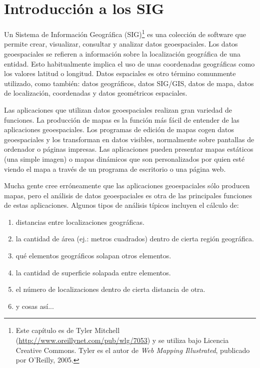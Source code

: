 
\section{Introducción a los SIG}\label{label_intro}


Un Sistema de Información Geográfica (SIG)\cite{mitchel05}\footnote{Este 
capítulo es de Tyler Mitchell (\url{http://www.oreillynet.com/pub/wlg/7053}) y 
se utiliza bajo Licencia Creative Commons. Tyler es el autor de 
\textit{Web Mapping Illustrated}, publicado por O'Reilly, 2005.}
es una colección de software que permite crear, visualizar, consultar y 
analizar datos geoespaciales. Los datos geoespaciales se refieren a 
información sobre la localización geográfica de una entidad. Esto 
habitualmente implica el uso de unas coordenadas geográficas como los valores 
latitud o longitud. Datos espaciales es otro término comunmente utilizado, como 
también: datos geográficos, datos SIG/GIS, datos de mapa, datos de localización, 
coordenadas y datos geométricos espaciales.

Las aplicaciones que utilizan datos geoespaciales realizan gran variedad de 
funciones. La producción de mapas es la función más fácil de entender de 
las aplicaciones geoespaciales. Los programas de edición de mapas cogen datos 
geoespaciales y los transforman en datos visibles, normalmente sobre pantallas
de ordenador o páginas impresas.
Las aplicaciones pueden presentar mapas estáticos (una simple imagen) o mapas
dinámicos que son personalizados por quien esté viendo el mapa a través de 
un programa de escritorio o una página web.

Mucha gente cree erróneamente que las aplicaciones geoespaciales sólo producen
mapas, pero el análisis de datos geoespaciales es otra de las principales 
funciones de estas aplicaciones. Algunos tipos de análisis típicos incluyen
el cálculo de:

\begin{enumerate}
\item distancias entre localizaciones geográficas.
\item la cantidad de área (ej.: metros cuadrados) dentro de cierta región
geográfica.
\item qué elementos geográficos solapan otros elementos.
\item la cantidad de superficie solapada entre elementos.
\item el número de localizaciones dentro de cierta distancia de otra.
\item y cosas así...
\end{enumerate}

